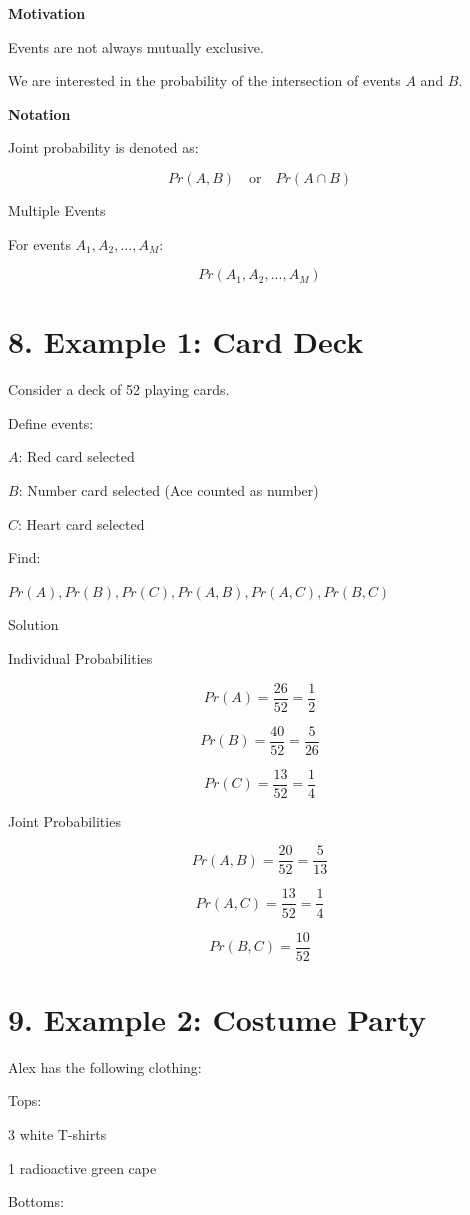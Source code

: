 \documentclass[12pt]{article}
\begin{document}
\textbf{Motivation}

Events are not always mutually exclusive.

We are interested in the probability of the intersection of events $A$ and $B$.

\textbf{Notation}

Joint probability is denoted as:

\[
Pr(A,B) \quad \text{or} \quad Pr(A \cap B)
\]

Multiple Events

For events $A_1, A_2, ..., A_M$:

\[
Pr(A_1, A_2, ..., A_M)
\]

\section*{8. Example 1: Card Deck}

Consider a deck of 52 playing cards.

Define events:

$A$: Red card selected

$B$: Number card selected (Ace counted as number)

$C$: Heart card selected

Find:

$Pr(A), Pr(B), Pr(C), Pr(A,B), Pr(A,C), Pr(B,C)$

Solution

Individual Probabilities

\[
Pr(A) = \frac{26}{52} = \frac{1}{2}
\]

\[
Pr(B) = \frac{40}{52} = \frac{5}{26}
\]

\[
Pr(C) = \frac{13}{52} = \frac{1}{4}
\]

Joint Probabilities

\[
Pr(A,B) = \frac{20}{52} = \frac{5}{13}
\]

\[
Pr(A,C) = \frac{13}{52} = \frac{1}{4}
\]

\[
Pr(B,C) = \frac{10}{52}
\]

\section*{9. Example 2: Costume Party}

Alex has the following clothing:

Tops:

3 white T-shirts

1 radioactive green cape

Bottoms:
\end{document}
